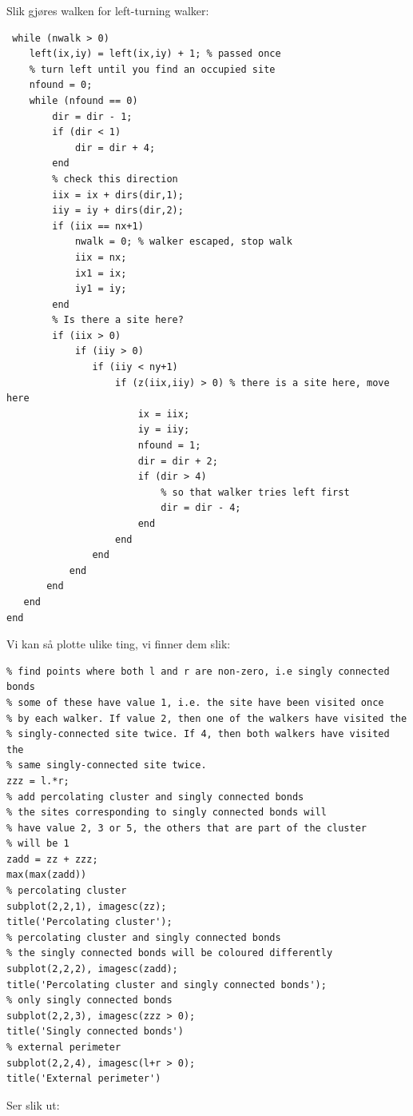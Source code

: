 \documentclass[english, a4paper]{article}
\begin{document}
Slik gjøres walken for left-turning walker:
\begin{lstlisting}
 while (nwalk > 0)
    left(ix,iy) = left(ix,iy) + 1; % passed once
    % turn left until you find an occupied site
    nfound = 0;
    while (nfound == 0)
        dir = dir - 1;
        if (dir < 1)
            dir = dir + 4;
        end
        % check this direction
        iix = ix + dirs(dir,1);
        iiy = iy + dirs(dir,2);
        if (iix == nx+1)
            nwalk = 0; % walker escaped, stop walk
            iix = nx;
            ix1 = ix;
            iy1 = iy;
        end
        % Is there a site here?
        if (iix > 0)
            if (iiy > 0)
               if (iiy < ny+1)
                   if (z(iix,iiy) > 0) % there is a site here, move here
                       ix = iix;
                       iy = iiy;
                       nfound = 1;
                       dir = dir + 2;
                       if (dir > 4)
                           % so that walker tries left first
                           dir = dir - 4;
                       end
                   end
               end
           end
       end
   end
end
\end{lstlisting}
Vi kan så plotte ulike ting, vi finner dem slik:
\begin{lstlisting}
% find points where both l and r are non-zero, i.e singly connected bonds
% some of these have value 1, i.e. the site have been visited once
% by each walker. If value 2, then one of the walkers have visited the
% singly-connected site twice. If 4, then both walkers have visited the
% same singly-connected site twice.
zzz = l.*r;
% add percolating cluster and singly connected bonds
% the sites corresponding to singly connected bonds will
% have value 2, 3 or 5, the others that are part of the cluster 
% will be 1
zadd = zz + zzz;
max(max(zadd))
% percolating cluster
subplot(2,2,1), imagesc(zz);
title('Percolating cluster');
% percolating cluster and singly connected bonds
% the singly connected bonds will be coloured differently
subplot(2,2,2), imagesc(zadd);
title('Percolating cluster and singly connected bonds');
% only singly connected bonds
subplot(2,2,3), imagesc(zzz > 0);
title('Singly connected bonds')
% external perimeter
subplot(2,2,4), imagesc(l+r > 0);
title('External perimeter')
\end{lstlisting}
Ser slik ut:
\end{document}
